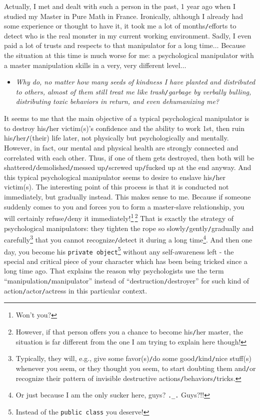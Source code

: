 \documentclass[12pt]{article}
\numberwithin{equation}{section}
\begin{document}
Actually, I met and dealt with such a person in the past, 1 year ago when I studied my Master in Pure Math in France. Ironically, although I already had some experience or thought to have it, it took me a lot of months\texttt{/}efforts to detect who is the real monster in my current working environment. Sadly, I even paid a lot of trusts and respects to that manipulator for a long time$\ldots$ Because the situation at this time is much worse for me: a psychological manipulator with a master manipulation skills in a very, very different level$\ldots$
\begin{itemize}
    \item \textit{Why do, no matter how many seeds of kindness I have planted and distributed to others, almost of them still treat me like trash\texttt{/}garbage by verbally bulling, distributing toxic behaviors in return, and even dehumanizing me?}
\end{itemize}
It seems to me that the main objective of a typical psychological manipulator is to destroy his\texttt{/}her victim(s)'s confidence and the ability to work 1st, then ruin his\texttt{/}her\texttt{/}(their) life later, not physically but psychologically and mentally. However, in fact, our mental and physical health are strongly connected and correlated with each other. Thus, if one of them gets destroyed, then both will be shattered\texttt{/}demolished\texttt{/}messed up\texttt{/}screwed up\texttt{/}fucked up at the end anyway. And this typical psychological manipulator seems to desire to enslave his\texttt{/}her victim(s). The interesting point of this process is that it is conducted not immediately, but gradually instead. This makes sense to me. Because if someone suddenly comes to you and forces you to form a master-slave relationship, you will certainly refuse\texttt{/}deny it immediately!\footnote{Won't you?}\,\footnote{However, if that person offers you a chance to become his\texttt{/}her master, the situation is far different from the one I am trying to explain here though!} That is exactly the strategy of psychological manipulators: they tighten the rope so slowly\texttt{/}gently\texttt{/}gradually and carefully\footnote{Typically, they will, e.g., give some favor(s)\texttt{/}do some good\texttt{/}kind\texttt{/}nice stuff(s) whenever you seem, or they thought you seem, to start doubting them and\texttt{/}or recognize their pattern of invisible destructive actions\texttt{/}behaviors\texttt{/}tricks.} that you cannot recognize\texttt{/}detect it during a long time\footnote{Or just because I am the only sucker here, guys? \texttt{.\_.} Guys?!!}. And then one day, you become his \texttt{private object}\footnote{Instead of the \texttt{public class} you deserve!} without any self-awareness left - the special and critical piece of your character which has been being tricked since a long time ago. That explains the reason why psychologists use the term ``manipulation\texttt{/}manipulator'' instead of ``destruction\texttt{/}destroyer'' for such kind of action\texttt{/}actor\texttt{/}actress in this particular context.
\end{document}
